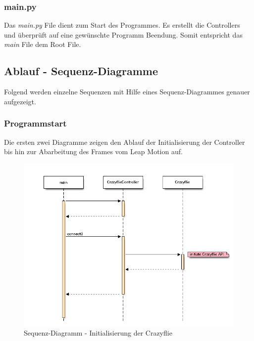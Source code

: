 \subsubsection{main.py}
Das \textit{main.py} File dient zum Start des Programmes. Es erstellt die Controllers und überprüft auf eine gewünschte Programm Beendung. Somit entspricht das \textit{main} File dem Root File.

\subsection{Ablauf - Sequenz-Diagramme}
Folgend werden einzelne Sequenzen mit Hilfe eines Sequenz-Diagrammes genauer aufgezeigt.

\subsubsection{Programmstart}
Die ersten zwei Diagramme zeigen den Ablauf der Initialisierung der Controller bis hin zur Abarbeitung des Frames vom Leap Motion auf.
\begin{figure}[H]
	\centering
	\includegraphics[width=1.0\textwidth]{figures/poc/seq_dia_crazyflie.png}
	\caption{Sequenz-Diagramm - Initialisierung der Crazyflie}
\end{figure}

